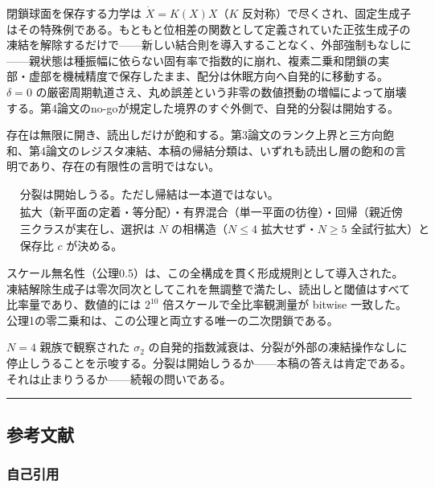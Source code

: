 \documentclass[
  a4paper,
]{ltjsarticle}
\begin{document}
閉鎖球面を保存する力学は \(\dot X=K(X)X\)（\(K\)
反対称）で尽くされ、固定生成子はその特殊例である。もともと位相差の関数として定義されていた正弦生成子の凍結を解除するだけで------新しい結合則を導入することなく、外部強制もなしに------親状態は種振幅に依らない固有率で指数的に崩れ、複素二乗和閉鎖の実部・虚部を機械精度で保存したまま、配分は休眠方向へ自発的に移動する。\(\delta=0\)
の厳密周期軌道さえ、丸め誤差という非零の数値摂動の増幅によって崩壊する。第4論文のno-goが規定した境界のすぐ外側で、自発的分裂は開始する。

存在は無限に開き、読出しだけが飽和する。第3論文のランク上界と三方向飽和、第4論文のレジスタ凍結、本稿の帰結分類は、いずれも読出し層の飽和の言明であり、存在の有限性の言明ではない。

\[
\boxed{
\begin{aligned}
&\text{分裂は開始しうる。ただし帰結は一本道ではない。}\\
&\text{拡大（新平面の定着・等分配）・有界混合（単一平面の彷徨）・回帰（親近傍への反復回帰）の}\\
&\text{三クラスが実在し、選択は }N\text{ の相構造（}N\le4\text{ 拡大せず・}N\ge5\text{ 全試行拡大）と}\\
&\text{保存比 }c\text{ が決める。}
\end{aligned}
}
\]

スケール無名性（公理0.5）は、この全構成を貫く形成規則として導入された。凍結解除生成子は零次同次としてこれを無調整で満たし、読出しと閾値はすべて比率量であり、数値的には
\(2^{10}\) 倍スケールで全比率観測量が bitwise
一致した。公理1の零二乗和は、この公理と両立する唯一の二次閉鎖である。

\(N=4\) 親族で観察された \(\sigma_2\)
の自発的指数減衰は、分裂が外部の凍結操作なしに停止しうることを示唆する。分裂は開始しうるか------本稿の答えは肯定である。それは止まりうるか------続報の問いである。

\begin{center}\rule{0.5\linewidth}{0.5pt}\end{center}

\subsection{参考文献}\label{ux53c2ux8003ux6587ux732e}

\subsubsection{自己引用}\label{ux81eaux5df1ux5f15ux7528}
\end{document}

